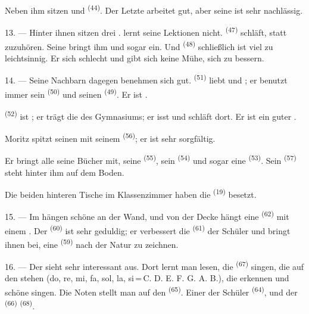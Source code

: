 Neben ihm sitzen  und  \textsuperscript{(44)}. Der
Letzte arbeitet gut, aber seine  ist sehr nachlässig.

13. --- Hinter ihnen sitzen drei .  lernt seine
Lektionen nicht.  \textsuperscript{(47)} schläft, statt zuzuhören. Seine
 bringt ihm  und sogar  ein. Und
 \textsuperscript{(48)} schließlich ist viel zu leichtsinnig. Er
 sich schlecht und gibt sich keine Mühe, sich zu bessern.

14. --- Seine Nachbarn dagegen benehmen sich gut. 
\textsuperscript{(51)} liebt  und ; er benutzt
immer sein  \textsuperscript{(50)} und seinen 
\textsuperscript{(49)}. Er ist .

 \textsuperscript{(52)} ist ; er trägt die
 des Gymnasiums; er isst und schläft dort. Er ist ein guter
.

Moritz spitzt seinen  mit seinem 
\textsuperscript{(56)}; er ist sehr sorgfältig.

Er bringt alle seine Bücher mit, seine  \textsuperscript{(55)}, sein
 \textsuperscript{(54)} und sogar eine 
\textsuperscript{(53)}. Sein  \textsuperscript{(57)} steht hinter ihm
auf dem Boden.

Die beiden hinteren Tische im Klassenzimmer haben die 
\textsuperscript{(19)} besetzt.

\VUsaut{4.6mm}
\VUsaut{3.4mm}

15. --- Im  hängen schöne  an der Wand, und von
der Decke hängt eine  \textsuperscript{(62)} mit einem
. Der  \textsuperscript{(60)} ist sehr geduldig; er
verbessert die  \textsuperscript{(61)} der Schüler und bringt
ihnen bei, eine  \textsuperscript{(59)} nach der Natur zu zeichnen.

16. --- Der  sieht sehr interessant aus. Dort lernt man
 lesen, die  \textsuperscript{(67)} singen,
die auf den  stehen (do, re, mi, fa, sol, la, si\,=\,C. D. E.
F. G. A. B.), die  erkennen und schöne  singen.
Die Noten stellt man auf den  \textsuperscript{(65)}. Einer der
Schüler  \textsuperscript{(64)}, und der 
\textsuperscript{(66)}  \textsuperscript{(68)}.

